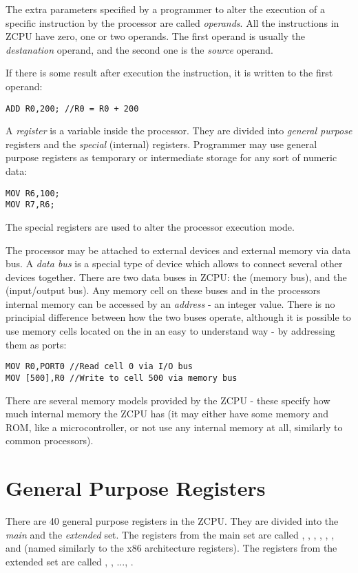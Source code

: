 The extra parameters specified by a programmer to alter the execution of a specific instruction by the processor are called \emph{operands}. All the instructions in ZCPU have zero, one or two operands. The first operand is usually the \emph{destanation} operand, and the second one is the \emph{source} operand.

If there is some result after execution the instruction, it is written to the first operand:
\begin{verbatim}
ADD R0,200; //R0 = R0 + 200
\end{verbatim}

A \emph{register} is a variable inside the processor. They are divided into \emph{general purpose} registers and the \emph{special} (internal) registers. Programmer may use general purpose registers as temporary or intermediate storage for any sort of numeric data:
\begin{verbatim}
MOV R6,100;
MOV R7,R6;
\end{verbatim}

The special registers are used to alter the processor execution mode.

The processor may be attached to external devices and external memory via data bus. A \emph{data bus} is a special type of device which allows to connect several other devices together. There are two data buses in ZCPU: the  (memory bus), and the  (input/output bus). Any memory cell on these buses and in the processors internal memory can be accessed by an \emph{address} - an integer value. There is no principial difference between how the two buses operate, although it is possible to use memory cells located on the  in an easy to understand way - by addressing them as ports:
\begin{verbatim}
MOV R0,PORT0 //Read cell 0 via I/O bus
MOV [500],R0 //Write to cell 500 via memory bus
\end{verbatim}

There are several memory models provided by the ZCPU - these specify how much internal memory the ZCPU has (it may either have some memory and ROM, like a microcontroller, or not use any internal memory at all, similarly to common processors).

\section{General Purpose Registers}
There are 40 general purpose registers in the ZCPU. They are divided into the \emph{main} and the \emph{extended} set. The registers from the main set are called , , , , , ,  and  (named similarly to the x86 architecture registers). The registers from the extended set are called , , ..., . 

